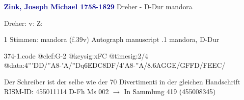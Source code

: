 \documentclass[twocolumn]{book}
\begin{document}
\newline \par \vspace{7pt} \textcolor{darkblue}{\textbf{Zink, Joseph Michael  1758-1829}}
\newline Dreher - D-Dur
\newline mandora
\newline \begin{itshape}[f.39v, at left:] Dreher: v: Z:\end{itshape} 
\newline \textcolor{darkblue}{}  1 Stimmen: mandora  (f.39v)
\newline Autograph manuscript
.1  mandora, D-Dur  
\begin{filecontents*}{374-1.code}
@clef:G-2
@keysig:xFC
@timesig:2/4
@data:4'''DD/''A8-'A/{''Dq6EDC}{8DF}/4'A8-''A/{8.6AGGE}/{GFFD}/{FEEC}/
\end{filecontents*}
\newline
%
\newline Der Schreiber ist der selbe wie der 70 Divertimenti in der gleichen Handschrift
\newline RISM-ID: 455011114
\newline D-Fh  Ms 002
\newline $\rightarrow$ In Sammlung 419 (455008345)
      
\end{document}
